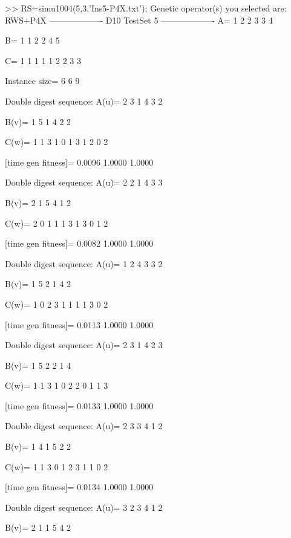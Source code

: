 >> RS=simu1004(5,3,'Ins5-P4X.txt');
Genetic operator(s) you selected are:
RWS+P4X
------------------- D10 TestSet 5 -------------------
A=
     1     2     2     3     3     4

B=
     1     1     2     2     4     5

C=
     1     1     1     1     1     2     2     3     3

Instance size=
     6     6     9

Double digest sequence:
A(u)=
     2     3     1     4     3     2

B(v)=
     1     5     1     4     2     2

C(w)=
     1     1     3     1     0     1     3     1     2     0     2

[time gen fitness]=
    0.0096    1.0000    1.0000

Double digest sequence:
A(u)=
     2     2     1     4     3     3

B(v)=
     2     1     5     4     1     2

C(w)=
     2     0     1     1     1     3     1     3     0     1     2

[time gen fitness]=
    0.0082    1.0000    1.0000

Double digest sequence:
A(u)=
     1     2     4     3     3     2

B(v)=
     1     5     2     1     4     2

C(w)=
     1     0     2     3     1     1     1     1     3     0     2

[time gen fitness]=
    0.0113    1.0000    1.0000

Double digest sequence:
A(u)=
     2     3     1     4     2     3

B(v)=
     1     5     2     2     1     4

C(w)=
     1     1     3     1     0     2     2     0     1     1     3

[time gen fitness]=
    0.0133    1.0000    1.0000

Double digest sequence:
A(u)=
     2     3     3     4     1     2

B(v)=
     1     4     1     5     2     2

C(w)=
     1     1     3     0     1     2     3     1     1     0     2

[time gen fitness]=
    0.0134    1.0000    1.0000

Double digest sequence:
A(u)=
     3     2     3     4     1     2

B(v)=
     2     1     1     5     4     2

